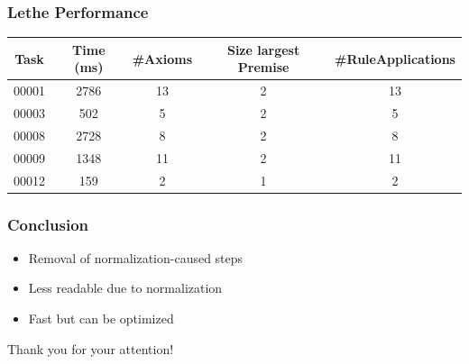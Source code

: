 \documentclass{beamer}
\begin{document}
             \begin{frame}
                \frametitle{Lethe Performance}

                {\footnotesize
                
                \begin{table}[h]
                    \centering
                    \begin{tabular}{|c|c|c|c|c|}
                      \hline
                      \textbf{Task} & \textbf{Time (ms)} & \textbf{\#Axioms} & \textbf{Size largest Premise} & \textbf{\#RuleApplications} \\
                      \hline
                      \hline
                      00001 & 2786 & 13 & 2 & 13 \\
                      00003 & 502 & 5 & 2 & 5  \\
                      00008 & 2728 & 8 & 2 & 8  \\
                      00009 & 1348 & 11 & 2 & 11 \\
                      00012 & 159 & 2 & 1 & 2  \\
                      \hline
                    \end{tabular}
                  \end{table}
                  }
             \end{frame}

             \begin{frame}
                \frametitle{Conclusion}
                \begin{itemize}
                    \item Removal of normalization-caused steps
                    \item Less readable due to normalization
                    \item Fast but can be optimized
                \end{itemize}
                 
             \end{frame}

             \begin{frame}
                \begin{center}
                    \Huge Thank you for your attention!
                \end{center}
                 
             \end{frame}
             
                
\end{document}
